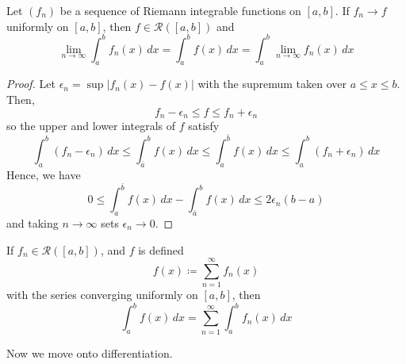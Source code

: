   \begin{theorem}
    Let $(f_n)$ be a sequence of Riemann integrable functions on $[a, b]$. If $f_n \to f$ uniformly on $[a, b]$, then $f \in \mathcal{R}([a, b])$ and 
    \begin{equation}
      \lim_{n \to \infty} \int_a^b f_n(x) \,dx = \int_a^b f(x) \,dx = \int_a^b \lim_{n \to \infty} f_n (x) \,dx 
    \end{equation}
  \end{theorem} 
  \begin{proof}
    Let $\epsilon_n = \sup | f_n (x) - f(x)|$ with the supremum taken over $a \leq x \leq b$. Then, 
    \begin{equation}
      f_n - \epsilon_n \leq f \leq f_n + \epsilon_n
    \end{equation}
    so the upper and lower integrals of $f$ satisfy 
    \begin{equation}
      \int_a^b (f_n - \epsilon_n) \,dx \leq \int_{\bar{a}}^b f(x) \,dx \leq \int_a^{\bar{b}} f(x) \,dx \leq \int_a^b (f_n + \epsilon_n) \,dx
    \end{equation}
    Hence, we have 
    \begin{equation}
      0 \leq \int_a^{\bar{b}} f(x)\,dx - \int_{\bar{a}}^b f(x) \,dx \leq 2 \epsilon_n (b - a) 
    \end{equation}
    and taking $n \to \infty$ sets $\epsilon_n \to 0$. 
  \end{proof}

  \begin{corollary}
    If $f_n \in \mathcal{R}([a, b])$, and $f$ is defined 
    \begin{equation}
      f(x) \coloneqq \sum_{n=1}^\infty f_n (x) 
    \end{equation}
    with the series converging uniformly on $[a, b]$, then 
    \begin{equation}
      \int_a^b f(x) \,dx = \sum_{n=1}^\infty \int_a^b f_n (x)\,dx
    \end{equation}
  \end{corollary}

  Now we move onto differentiation. 

